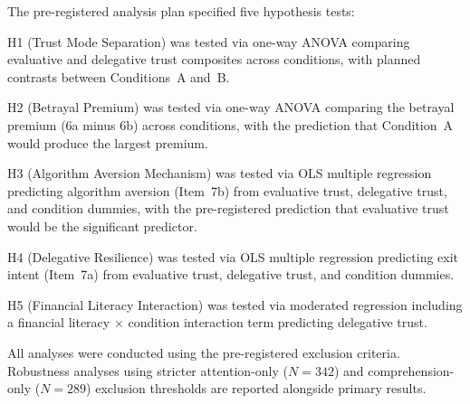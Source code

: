 The pre-registered analysis plan specified five hypothesis tests:

H1 (Trust Mode Separation) was tested via one-way ANOVA comparing evaluative and delegative trust composites across conditions, with planned contrasts between Conditions~A and~B.

H2 (Betrayal Premium) was tested via one-way ANOVA comparing the betrayal premium (6a minus 6b) across conditions, with the prediction that Condition~A would produce the largest premium.

H3 (Algorithm Aversion Mechanism) was tested via OLS multiple regression predicting algorithm aversion (Item~7b) from evaluative trust, delegative trust, and condition dummies, with the pre-registered prediction that evaluative trust would be the significant predictor.

H4 (Delegative Resilience) was tested via OLS multiple regression predicting exit intent (Item~7a) from evaluative trust, delegative trust, and condition dummies.

H5 (Financial Literacy Interaction) was tested via moderated regression including a financial literacy $\times$ condition interaction term predicting delegative trust.

All analyses were conducted using the pre-registered exclusion criteria. Robustness analyses using stricter attention-only ($N = 342$) and comprehension-only ($N = 289$) exclusion thresholds are reported alongside primary results.
